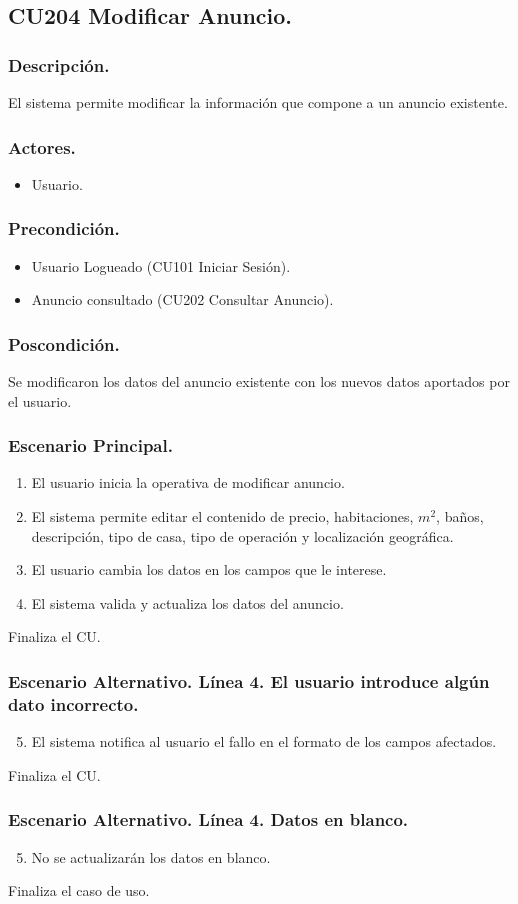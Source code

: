 \subsection{CU204 Modificar Anuncio.}
\subsubsection{Descripci\'{o}n.}
El sistema permite modificar la informaci\'{o}n que compone a un anuncio existente.
\subsubsection{Actores.}
\begin{itemize}
\item Usuario.
\end{itemize}
\subsubsection{Precondici\'{o}n.}
\begin{itemize}
\item Usuario Logueado (CU101 Iniciar Sesi\'{o}n).
\item Anuncio consultado (CU202 Consultar Anuncio).
\end{itemize}
\subsubsection{Poscondici\'{o}n.}
Se modificaron los datos del anuncio existente con los nuevos datos aportados por el usuario.
\subsubsection{Escenario Principal.}
\begin{enumerate}
\item El usuario inicia la operativa de modificar anuncio.
\item El sistema permite editar el contenido de precio, habitaciones, $m^{2}$, ba\~{n}os, descripci\'{o}n, tipo de casa, tipo de operaci\'{o}n y localizaci\'{o}n geogr\'{a}fica.
\item El usuario cambia los datos en los campos que le interese.
\item El sistema valida y actualiza los datos del anuncio.
\end{enumerate}
Finaliza el CU.
\subsubsection{Escenario Alternativo. L\'{i}nea 4. El usuario introduce alg\'{u}n dato incorrecto.}
\begin{enumerate}
\setcounter{enumi}{4}
\item El sistema notifica al usuario el fallo en el formato de los campos afectados.
\end{enumerate}
Finaliza el CU.
\subsubsection{Escenario Alternativo. L\'{i}nea 4. Datos en blanco.}
\begin{enumerate}
\setcounter{enumi}{4}
\item No se actualizar\'{a}n los datos en blanco.
\end{enumerate}
Finaliza el caso de uso.